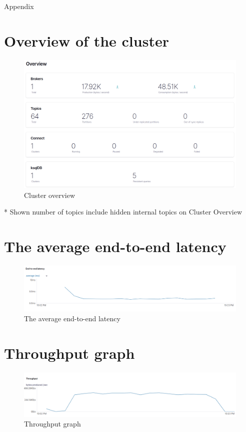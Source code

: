 \begin{Huge}
Appendix
\end{Huge}


\section{Overview of the cluster}
\begin{figure}[H]
    \centerline{\includegraphics[scale=.3]{assets/appendices/overview.png}}
    \caption{Cluster overview  }
    \label{fig}
\end{figure}
* Shown number of topics include hidden internal topics on Cluster Overview
\section{The average end-to-end latency}
\begin{figure}[H]
    \centerline{\includegraphics[scale=.4]{assets/appendices/average-end-to-end-latency.png}}
    \caption{The average end-to-end latency}
    \label{fig}
\end{figure}

\section{Throughput graph}
\begin{figure}[H]
    \centerline{\includegraphics[scale=.4]{assets/appendices/throughput_graph.png}}
    \caption{Throughput graph}
    \label{fig}
\end{figure}

